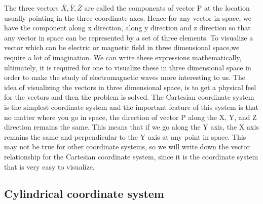 	 The three vectors \textbf{$\overline{X},\overline{Y}, \overline{Z}$} are called the components of vector P at the location usually pointing in the three coordinate axes. Hence for any vector in space, we have the component along x direction, along y direction and z direction so that any vector in space can be represented by a set of three elements. To visualize a vector which can be electric or magnetic field in three dimensional space,we require a lot of imagination. We can write these expressions mathematically, ultimately, it is required for one to visualize these in three dimensional space in order to make the study of electromagnetic waves more interesting to us. The idea of visualizing the vectors in three dimensional space, is to get a physical feel for the vectors and then the problem is solved. The Cartesian coordinate system is the simplest coordinate system and the important feature of this system is that no matter where you go in space, the direction of vector P along the X, Y, and Z direction remains the same. This means that if we go along the Y axis, the X axis remains the same and perpendicular to the Y axis at any point in space. This may not be true for other coordinate systems, so we will write down the vector relationship for the Cartesian coordinate system, since it is the coordinate system that is very easy to visualize. 
	 
	 \subsection{Cylindrical coordinate system}    
	
